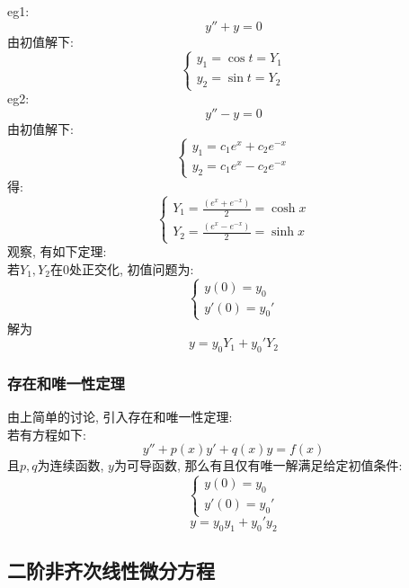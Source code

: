 eg1:
\[ y'' + y = 0 \]
由初值解下:
\[
\left\{
\begin{aligned}
    y_1 = \cos t = Y_1  \\
    y_2 = \sin t = Y_2
\end{aligned}
\right.
\]
eg2:
\[ y'' - y = 0 \]
由初值解下:
\[
\left\{
\begin{aligned}
    y_1 = c_1 e^x + c_2 e^{-x} \\
    y_2 = c_1 e^x - c_2 e^{-x}
\end{aligned}
\right.
\]
得:
\[
\left\{
\begin{aligned}
    Y_1 = \frac{(e^x +  e^{-x})}{2} = \cosh x  \\
    Y_2 = \frac{(e^x -  e^{-x})}{2} = \sinh x
\end{aligned}
\right.
\]
观察, 有如下定理:\\
若$Y_1, Y_2$在$0$处正交化, 初值问题为:
\[
\left\{
\begin{aligned}
    y(0) = y_0  \\
    y'(0) = y_0'
\end{aligned}
\right.
\]
解为
\[ y = y_0 Y_1 + y_0' Y_2 \]
\subsubsection{\large 存在和唯一性定理}
由上简单的讨论, 引入存在和唯一性定理:\\
若有方程如下:
\[ y'' + p(x)y' + q(x)y = f(x) \]
且$p, q$为连续函数, $y$为可导函数,
那么有且仅有唯一解满足给定初值条件:
\[
\left\{
\begin{aligned}
    y(0) = y_0  \\
    y'(0) = y_0'
\end{aligned}
\right.
\]
\[ y = y_0 y_1 + y_0' y_2 \]

\subsection{\LARGE 二阶非齐次线性微分方程}
